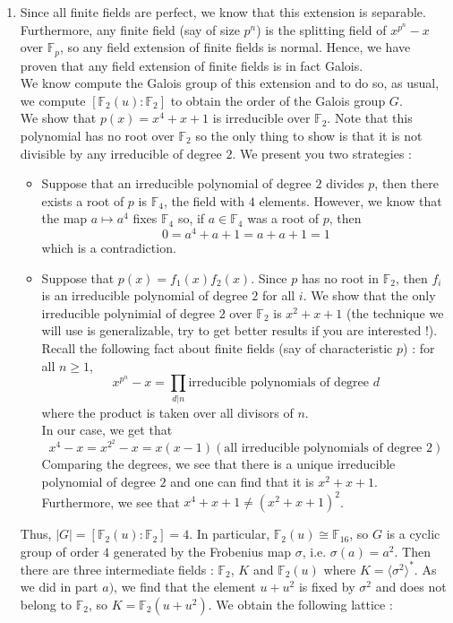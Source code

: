 \documentclass[12pt,a4paper]{article}
\begin{document}
\begin{enumerate}[label = \alph*)]
\[\begin{tikzcd}
	&\mathbb{Q} \arrow[ul] \arrow[u] \arrow[ur]&
	\end{tikzcd} \]
	\item Since all finite fields are perfect, we know that this extension is separable. Furthermore, any finite field (say of size $p^n$) is the splitting field of $x^{p^n} - x$ over $\mathbb{F}_p$, so any field extension of finite fields is normal. Hence, we have proven that any field extension of finite fields is in fact Galois. \\
	We know compute the Galois group of this extension and to do so, as usual, we compute $[\mathbb{F}_2(u) : \mathbb{F}_2]$ to obtain the order of the Galois group $G$. \\
	We show that $p(x) = x^4 + x + 1$ is irreducible over $\mathbb{F}_2$. Note that this polynomial has no root over $\mathbb{F}_2$ so the only thing to show is that it is not divisible by any irreducible of degree $2$. We present you two strategies : 
	\begin{itemize}
		\item Suppose that an irreducible polynomial of degree $2$ divides $p$, then there exists a root of $p$ is $\mathbb{F}_4$, the field with $4$ elements. However, we know that the map $a \mapsto a^4$ fixes $\mathbb{F}_4$ so, if $a \in \mathbb{F}_4$ was a root of $p$, then \[0 = a^4 + a + 1 = a + a + 1 = 1\] which is a contradiction.
		\item Suppose that $p(x) = f_1(x)f_2(x)$. Since $p$ has no root in $\mathbb{F}_2$, then $f_i$ is an irreducible polynomial of degree $2$ for all $i$. We show that the only irreducible polynimial of degree $2$ over $\mathbb{F}_2$ is $x^2 + x + 1$ (the technique we will use is generalizable, try to get better results if you are interested !). \\
		Recall the following fact about finite fields (say of characteristic $p$) : for all $n \geq 1$, \[ x^{p^n} - x = \prod_{d|n}\mbox{irreducible polynomials of degree }d \] where the product is taken over all divisors of $n$. \\
		In our case, we get that \[x^4 - x = x^{2^2} - x = x(x - 1)(\mbox{all irreducible polynomials of degree }2)\] Comparing the degrees, we see that there is a unique irreducible polynomial of degree $2$ and one can find that it is $x^2 + x + 1$. \\
		Furthermore, we see that $x^4 + x + 1 \neq (x^2 + x + 1)^2$.
	\end{itemize}
	Thus, $|G| = [\mathbb{F}_2(u) : \mathbb{F}_2] = 4$. In particular, $\mathbb{F}_2(u) \cong \mathbb{F}_{16}$, so $G$ is a cyclic group of order $4$ generated by the Frobenius map $\sigma$, i.e. $\sigma(a) = a^2$. Then there are three intermediate fields : $\mathbb{F}_2$, $K$ and $\mathbb{F}_2(u)$ where $K = \langle \sigma^2 \rangle^*$. As we did in part $a)$, we find that the element $u + u^2$ is fixed by $\sigma^2$ and does not belong to $\mathbb{F}_2$, so $K = \mathbb{F}_2(u + u^2)$. We obtain the following lattice : \[  
\]
\end{enumerate}
\end{document}
